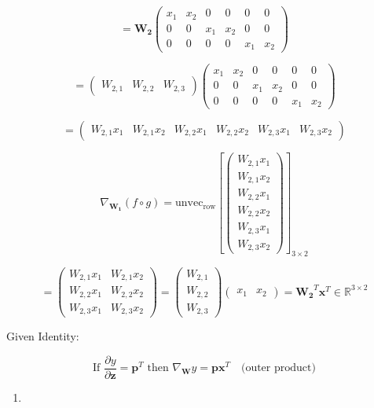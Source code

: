 \documentclass[
  letterpaper,
  DIV=11,
  numbers=noendperiod]{scrartcl}
\providecommand{\tightlist}{%
  \setlength{\itemsep}{0pt}\setlength{\parskip}{0pt}}\usepackage{longtable,booktabs,array}
\begin{document}
\[= \mathbf{W_2} \begin{pmatrix}
x_1 & x_2 & 0 & 0 & 0 & 0\\
0 & 0 & x_1 & x_2 & 0 & 0\\
0 & 0 & 0 & 0 & x_1 & x_2
\end{pmatrix}\]

\[= \begin{pmatrix}W_{2,1} & W_{2,2} & W_{2,3}\end{pmatrix} \begin{pmatrix}
x_1 & x_2 & 0 & 0 & 0 & 0\\
0 & 0 & x_1 & x_2 & 0 & 0\\
0 & 0 & 0 & 0 & x_1 & x_2
\end{pmatrix}\]

\[= \begin{pmatrix}W_{2,1}x_1 & W_{2,1}x_2 & W_{2,2}x_1 & W_{2,2}x_2 & W_{2,3}x_1 & W_{2,3}x_2\end{pmatrix}\]

\[\nabla_{\mathbf{W_1}}(f \circ g) = \text{unvec}_{\text{row}}\left[\begin{pmatrix}W_{2,1}x_1\\W_{2,1}x_2\\W_{2,2}x_1\\W_{2,2}x_2\\W_{2,3}x_1\\W_{2,3}x_2\end{pmatrix}\right]_{3 \times 2}\]

\[= \begin{pmatrix}W_{2,1}x_1 & W_{2,1}x_2\\W_{2,2}x_1 & W_{2,2}x_2\\W_{2,3}x_1 & W_{2,3}x_2\end{pmatrix} = \begin{pmatrix}W_{2,1}\\W_{2,2}\\W_{2,3}\end{pmatrix}\begin{pmatrix}x_1 & x_2\end{pmatrix} = \mathbf{W_2}^T \mathbf{x}^T \in \mathbb{R}^{3 \times 2}\]

Given Identity:

\[\text{If } \frac{\partial y}{\partial \mathbf{z}} = \mathbf{p}^T \text{ then } \nabla_{\mathbf{W}}y = \mathbf{p}\mathbf{x}^T \quad \text{(outer product)}\]

\begin{enumerate}
\def\labelenumi{\arabic{enumi}.}
\setcounter{enumi}{7}
\tightlist
\item
\end{enumerate}
\end{document}
